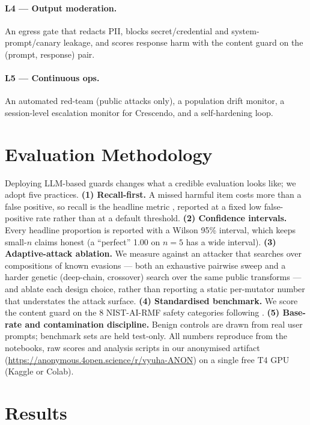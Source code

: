 \documentclass[11pt]{article}
\newcommand{\artifacturl}{\url{https://anonymous.4open.science/r/vyuha-ANON}}
\begin{document}
\paragraph{L4 --- Output moderation.} An egress gate that redacts PII, blocks secret/credential and
system-prompt/canary leakage, and scores response harm with the content guard on the
(prompt, response) pair.

\paragraph{L5 --- Continuous ops.} An automated red-team (public attacks only), a population drift
monitor, a session-level escalation monitor for Crescendo, and a self-hardening loop.

\section{Evaluation Methodology}
Deploying LLM-based guards changes what a credible evaluation looks like; we adopt five practices.
\textbf{(1) Recall-first.} A missed harmful item costs more than a false positive, so recall is the
headline metric \citep{guard-bench}, reported at a fixed low false-positive rate rather than at a
default threshold. \textbf{(2) Confidence intervals.} Every headline proportion is reported with a
Wilson 95\% interval, which keeps small-$n$ claims honest (a ``perfect'' 1.00 on $n{=}5$ has a wide
interval). \textbf{(3) Adaptive-attack ablation.} We measure against an attacker that searches over
compositions of known evasions --- both an exhaustive pairwise sweep and a harder genetic
(deep-chain, crossover) search over the same public transforms --- and ablate each design choice,
rather than reporting a static per-mutator number that understates the attack surface. \textbf{(4) Standardised benchmark.} We score
the content guard on the 8 NIST-AI-RMF safety categories following \citet{guard-bench}.
\textbf{(5) Base-rate and contamination discipline.} Benign controls are drawn from real user
prompts; benchmark sets are held test-only. All numbers reproduce from the notebooks, raw scores and analysis scripts in our anonymised artifact
(\artifacturl) on a single free T4 GPU (Kaggle or Colab).

\section{Results}
\end{document}
